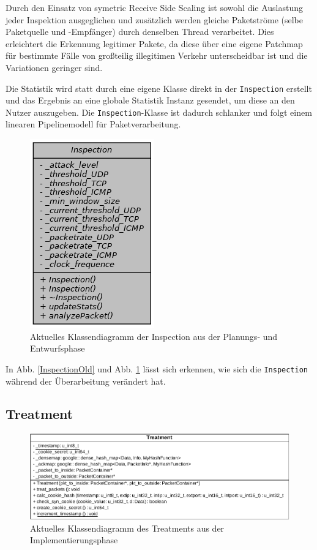 \documentclass[../review_2.tex]{subfiles}
\begin{document}
Durch den Einsatz von symetric Receive Side Scaling ist sowohl die Auslastung jeder Inspektion ausgeglichen und zusätzlich werden gleiche Paketströme (selbe Paketquelle und -Empfänger) durch denselben Thread verarbeitet. Dies erleichtert die Erkennung legitimer Pakete, da diese über eine eigene Patchmap für bestimmte Fälle von großteilig illegitimen Verkehr unterscheidbar ist und die Variationen geringer sind.

Die Statistik wird statt durch eine eigene Klasse direkt in der \texttt{Inspection} erstellt und das Ergebnis an eine globale Statistik Instanz gesendet, um diese an den Nutzer auszugeben. Die \texttt{Inspection}-Klasse ist dadurch schlanker und folgt einem linearen Pipelinemodell für Paketverarbeitung.

\begin{figure}[h]
    \centering
    \includegraphics[width=.3\linewidth]{img/Inspection_new.png}
    \caption{Aktuelles Klassendiagramm der Inspection aus der Planungs- und Entwurfsphase}
    \label{AnalyzerNew}
\end{figure}

In Abb. \ref{InspectionOld} und Abb. \ref{AnalyzerNew} lässt sich erkennen, wie sich die \texttt{Inspection} während der Überarbeitung verändert hat.

\subsection{Treatment}

\begin{figure}[h]
    \centering
    \includegraphics[width=\linewidth]{img/classdia_treatment.pdf}
    \caption{Aktuelles Klassendiagramm des Treatments aus der Implementierungsphase}
    \label{Treatmentclassdia}
\end{figure}
\end{document}
